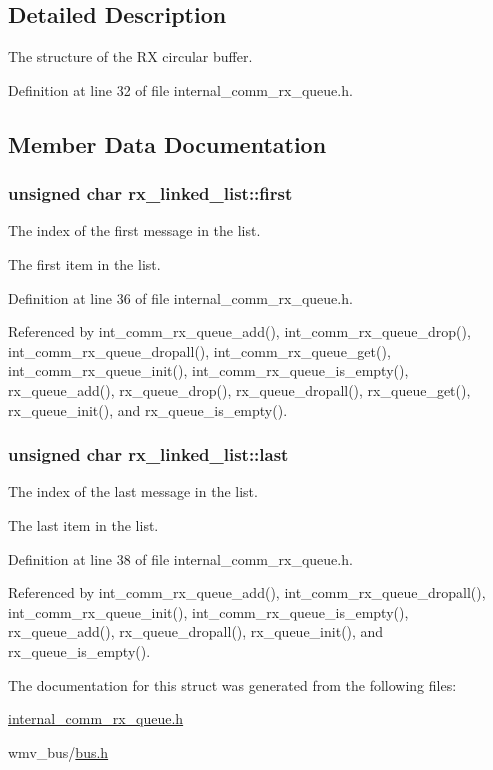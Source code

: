 \subsection{Detailed Description}
The structure of the RX circular buffer. 

Definition at line 32 of file internal\_\-comm\_\-rx\_\-queue.h.

\subsection{Member Data Documentation}
\hypertarget{structrx__linked__list_5a6fd79367e1878f5c648fec5927b017}{
\subsubsection[{first}]{\setlength{\rightskip}{0pt plus 5cm}unsigned char {\bf rx\_\-linked\_\-list::first}}}
\label{structrx__linked__list_5a6fd79367e1878f5c648fec5927b017}


The index of the first message in the list. 

The first item in the list. 

Definition at line 36 of file internal\_\-comm\_\-rx\_\-queue.h.

Referenced by int\_\-comm\_\-rx\_\-queue\_\-add(), int\_\-comm\_\-rx\_\-queue\_\-drop(), int\_\-comm\_\-rx\_\-queue\_\-dropall(), int\_\-comm\_\-rx\_\-queue\_\-get(), int\_\-comm\_\-rx\_\-queue\_\-init(), int\_\-comm\_\-rx\_\-queue\_\-is\_\-empty(), rx\_\-queue\_\-add(), rx\_\-queue\_\-drop(), rx\_\-queue\_\-dropall(), rx\_\-queue\_\-get(), rx\_\-queue\_\-init(), and rx\_\-queue\_\-is\_\-empty().\hypertarget{structrx__linked__list_55919c4eeb81169077b203ae1dcb33be}{
\subsubsection[{last}]{\setlength{\rightskip}{0pt plus 5cm}unsigned char {\bf rx\_\-linked\_\-list::last}}}
\label{structrx__linked__list_55919c4eeb81169077b203ae1dcb33be}


The index of the last message in the list. 

The last item in the list. 

Definition at line 38 of file internal\_\-comm\_\-rx\_\-queue.h.

Referenced by int\_\-comm\_\-rx\_\-queue\_\-add(), int\_\-comm\_\-rx\_\-queue\_\-dropall(), int\_\-comm\_\-rx\_\-queue\_\-init(), int\_\-comm\_\-rx\_\-queue\_\-is\_\-empty(), rx\_\-queue\_\-add(), rx\_\-queue\_\-dropall(), rx\_\-queue\_\-init(), and rx\_\-queue\_\-is\_\-empty().

The documentation for this struct was generated from the following files:\begin{CompactItemize}
\item 
\hyperlink{internal__comm__rx__queue_8h}{internal\_\-comm\_\-rx\_\-queue.h}\item 
wmv\_\-bus/\hyperlink{bus_8h}{bus.h}\end{CompactItemize}
